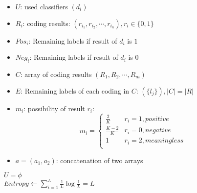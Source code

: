 \documentclass{article}
\begin{document}

\begin{itemize}
\item $U$: used classifiers $(d_{i})$
\item $R_i$: coding results: $(r_{i_1},r_{i_2},\cdots,r_{i_{n}}),r_i\in\{0,1\}$
\item $Pos_i$: Remaining labels if result of $d_i$ is $1$
\item $Neg_i$: Remaining labels if result of $d_i$ is $0$
\item $C$: array of coding results $(R_1,R_2,\cdots,R_m)$
\item $E$: Remaining labels of each coding in $C$: $(\{l_j\}),|C|=|R|$
\item $m_i$: possibility of result $r_i$:
$$
m_i=\left\{
\begin{array}{cc}
\frac{2}{K} & r_i=1, positive\\
\frac{K-2}{K} & r_i=0, negative\\
1 & r_i=2, meaningless\\
\end{array}
\right.
$$

\item $a=(a_1,a_2)$: concatenation of two arrays

\end{itemize}

\begin{algorithm}
\caption{}
$U=\phi$\\
$Entropy\leftarrow \sum_{i=1}^{L}\frac{1}{L}\log\frac{1}{L}=L$\\

\end{algorithm}
\end{document}
